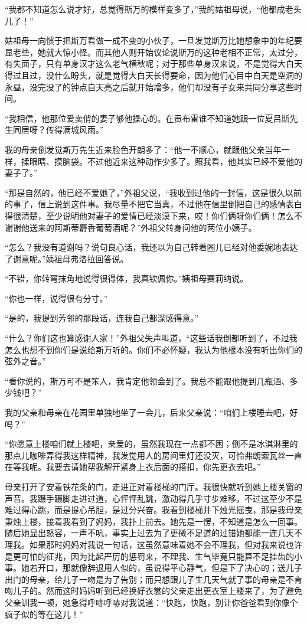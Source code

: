 \par “我都不知道怎么说才好，总觉得斯万的模样变多了，”我的姑祖母说，“他都成老头儿了！”
\par 姑祖母一向惯于把斯万看做一成不变的小伙子，一旦发觉斯万比她想象中的年纪要显老些，她就大惊小怪。而其他人则开始议论说斯万的这种老相不正常，太过分，有失面子，只有单身汉才这么老气横秋呢；对于那些单身汉来说，不是觉得大白天得过且过，没什么盼头，就是觉得大白天长得要命，因为他们心目中白天是空洞的永昼，没完没了的钟点自天亮之后就开始增多，他们却没有子女来共同分享这些时间。
\par “我相信，他那位爱卖俏的妻子够他操心的。在贡布雷谁不知道她跟一位夏吕斯先生同居呀？传得满城风雨。”
\par 我的母亲倒发觉斯万先生近来脸色开朗多了：“他一不顺心，就跟他父亲当年一样，揉眼睛、摸脑袋。不过他近来这种动作少多了。照我看，他其实已经不爱他的妻子了。”
\par “那是自然的，他已经不爱她了，”外祖父说，“我收到过他的一封信，这是很久以前的事了，信上说到这件事。我尽量不把它当真，不过他在信里倒把自己的感情表白得很清楚，至少说明他对妻子的爱情已经淡漠下来，哎！你们俩呀你们俩！怎么不谢谢他送来的阿斯蒂麝香葡萄酒呢？”外祖父转身问他的两位小姨子。
\par “怎么？我没有道谢吗？说句良心话，我还以为自己转着圈儿已经对他委婉地表达了谢意呢。”姨祖母弗洛拉回答说。
\par “不错，你转弯抹角地说得很得体，我真钦佩你。”姨祖母赛莉纳说。
\par “你也一样，说得很有分寸。”
\par “是的，我提到芳邻的那段话，连我自己都深感得意。”
\par “什么？你们这也算感谢人家！”外祖父失声叫道，“这些话我倒都听到了，不过我怎么也想不到你们是说给斯万听的。你们不必怀疑，我认为他根本没有听出你们的弦外之音。”
\par “看你说的，斯万可不是笨人，我肯定他领会到了。我总不能跟他提到几瓶酒、多少钱吧？”
\par 我的父亲和母亲在花园里单独地坐了一会儿，后来父亲说：“咱们上楼睡去吧，好吗？”
\par “你愿意上楼咱们就上楼吧，亲爱的，虽然我现在一点都不困；倒不是冰淇淋里的那点儿咖啡弄得我这样精神，我发觉用人的房间里灯还没灭，可怜弗朗索瓦丝一直在等我呢。我要去请她帮我解开紧身上衣后面的搭扣，你先更衣去吧。”
\par 母亲打开了安着铁花条的门，走进正对着楼梯的门厅。我很快就听到她上楼关窗的声音。我蹑手蹑脚走进过道，心怦怦乱跳，激动得几乎寸步难移，不过这至少不是难过得心跳，而是提心吊胆，是过分兴奋。我看到楼梯井下烛光摇曳，那是我母亲秉烛上楼，接着我看到了妈妈，我扑上前去。她先是一愣，不知道是怎么一回事。随后她显出怒容，一声不吭，事实上过去为了更微不足道的过错她都能一连几天不理我。如果那时妈妈对我说一句话，这虽然意味着她不会不理我，但对我来说也许是更可怕的征兆，因为比起严厉的惩罚来，不理我、生气毕竟只能算不足挂齿的小事。她若开口，那就像辞退用人似的，虽说得平心静气，但是下了决心的；送儿子出门的母亲，给儿子一吻是为了告别；而只想跟儿子生几天气就了事的母亲是不肯吻儿子的。然而这时妈妈听到已经换好衣裳的父亲走出更衣室上楼来了，为了避免父亲训我一顿，她急得呼哧呼哧对我说道：“快跑，快跑，别让你爸爸看到你像个疯子似的等在这儿！”
